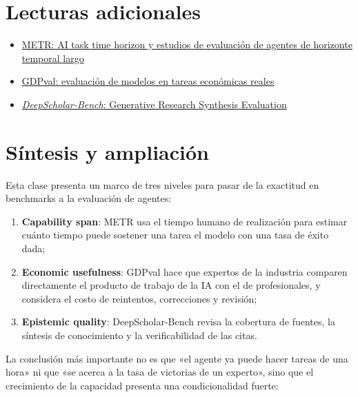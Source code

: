\documentclass[a4paper]{article}
\begin{document}
\section{Lecturas adicionales}

\begin{itemize}
    \item \href{https://metr.org/}{METR: AI task time horizon y estudios de evaluación de agentes de horizonte temporal largo}
    \item \href{https://openai.com/index/gdpval/}{GDPval: evaluación de modelos en tareas económicas reales}
    \item \href{https://arxiv.org/search/?query=DeepScholar-Bench\&searchtype=all}{\emph{DeepScholar-Bench}: Generative Research Synthesis Evaluation}
\end{itemize}

\section{Síntesis y ampliación}

Esta clase presenta un marco de tres niveles para pasar de la exactitud en benchmarks a la evaluación de agentes:

\begin{enumerate}
    \item \textbf{Capability span}: METR usa el tiempo humano de realización para estimar cuánto tiempo puede sostener una tarea el modelo con una tasa de éxito dada;
    \item \textbf{Economic usefulness}: GDPval hace que expertos de la industria comparen directamente el producto de trabajo de la IA con el de profesionales, y considera el costo de reintentos, correcciones y revisión;
    \item \textbf{Epistemic quality}: DeepScholar-Bench revisa la cobertura de fuentes, la síntesis de conocimiento y la verificabilidad de las citas.
\end{enumerate}

La conclusión más importante no es que «el agente ya puede hacer tareas de una hora» ni que «se acerca a la tasa de victorias de un experto», sino que el crecimiento de la capacidad presenta una condicionalidad fuerte:
\end{document}
